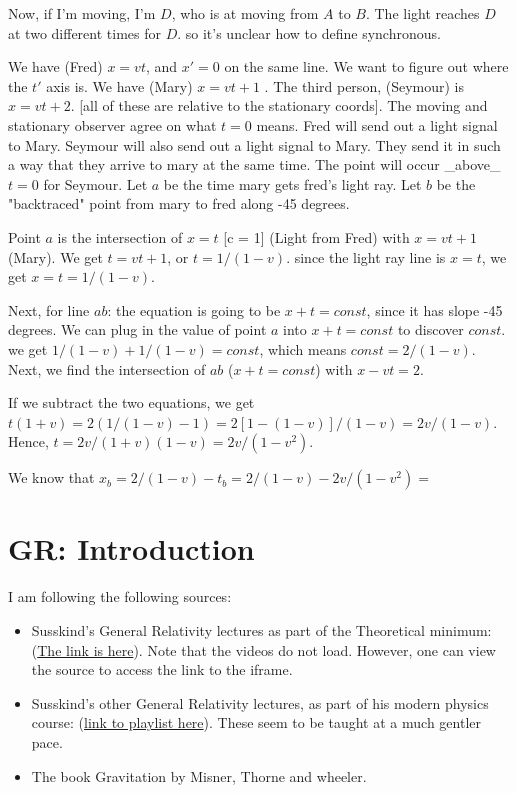 \documentclass[11pt]{book}
\begin{document}
Now, if I'm moving, I'm $D$, who is at moving from $A$ to $B$. The light
reaches $D$ at two different times for $D$. so it's unclear how to define
synchronous.


We have (Fred) $x = vt$, and $x' = 0$ on the same line. We want to figure out
where the $t'$ axis is. We have (Mary) $x = vt + 1$ . The
third person, (Seymour) is $x = vt + 2$. [all of these are relative to the stationary coords].
The moving and stationary observer agree on what $t = 0$ means. Fred will
send out a light signal to Mary. Seymour will also send out a light signal
to Mary. They send it in such a way that they arrive to mary at the same
time. The point will occur _above_ $t = 0$ for Seymour. Let $a$ be the
time mary gets fred's light ray. Let $b$ be the "backtraced" point from
mary to fred along -45 degrees.

Point $a$ is the intersection of $x = t$ [c = 1] (Light from Fred) 
with $x = vt + 1$ (Mary). We get $t = vt + 1$, or $t = 1/(1-v)$. since
the light ray line is $x = t$, we get $x = t = 1/(1-v)$.

Next, for line $ab$: the equation is going to be $x + t = const$, since it
has slope -45 degrees. We can plug in the value of point $a$ into $x +t = const$
to discover $const$. we get $1/(1-v) + 1/(1-v) = const$, which means
$const = 2/(1-v)$. Next, we find the intersection of $ab$ ($x+t = const$)
with $x - vt = 2$.

If we subtract the two equations, we get
$t(1+v) = 2(1/(1-v) - 1) = 2[1 - (1-v)]/(1-v) = 2v/(1-v)$.
Hence, $t = 2v/(1+v)(1-v) = 2v/(1-v^2)$.

We know that $x_b = 2/(1-v) - t_b = 2/(1-v) - 2v/(1-v^2) = $
\chapter{GR: Introduction}

I am following the following sources:

\begin{itemize}
    \item Susskind's General Relativity lectures as part of the Theoretical
        minimum: (\href{https://theoreticalminimum.com/courses/general-relativity/}{The link is here}).
        Note that the videos do not load. However, one can view the source to access the link
        to the iframe.
    \item Susskind's other General Relativity lectures, as part of his modern
        physics course: (\href{https://www.youtube.com/watch?v=hbmf0bB38h0&list=PL6C8BDEEBA6BDC78D}{link to playlist here}).
        These seem to be taught at a much gentler pace.
    \item The book Gravitation by Misner, Thorne and wheeler.
\end{itemize}
\end{document}
